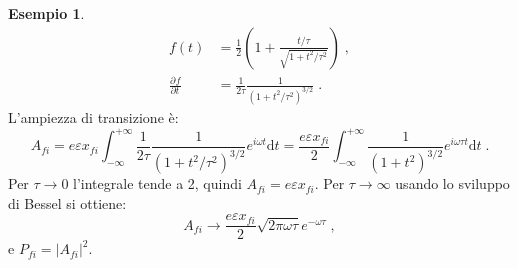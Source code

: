 \documentclass[10pt,a4paper]{report}
\theoremstyle{definition}
\newtheorem{exm}{Esempio}
\newcommand{\pdev}[3][]{\frac{\partial^{#1} #2}{\partial #3^{#1}}}
\numberwithin{equation}{section}
\newcommand{\diff}[1][]{\mathrm{d}#1}
\begin{document}
\begin{exm}
\begin{align*}
f(t)&=\frac{1}{2}\left(1+\frac{t/\tau}{\sqrt{1+t^2/\tau^2}}\right)\;, \\
\pdev{f}{t} &= \frac{1}{2\tau}\frac{1}{(1+t^2/\tau^2)^{3/2}}\;.
\end{align*}
L'ampiezza di transizione è:
\begin{equation*}
A_{fi}=e\varepsilon x_{fi}\int_{-\infty}^{+\infty} \frac{1}{2\tau}\frac{1}{(1+t^2/\tau^2)^{3/2}}e^{i\omega t}\diff{t}=\frac{e\varepsilon x_{fi}}{2}\int_{-\infty}^{+\infty}\frac{1}{(1+t^2)^{3/2}}e^{i\omega\tau t}\diff{t}\;.
\end{equation*}
Per $\tau\to 0$ l'integrale tende a 2, quindi $A_{fi}=e\varepsilon x_{fi}$. Per $\tau\to\infty$ usando lo sviluppo di Bessel si ottiene:
\begin{equation*}
A_{fi}\to \frac{e\varepsilon x_{fi}}{2}\sqrt{2\pi\omega\tau}e^{-\omega\tau}\;,
\end{equation*}
e $P_{fi}=|A_{fi}|^2$.
\end{exm}
\end{document}
